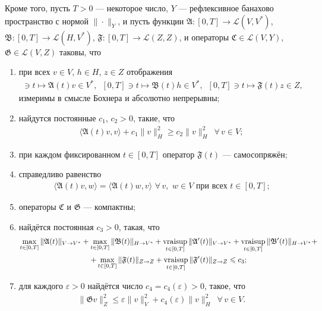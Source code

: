 \documentclass{report}
\newcommand{\vraisup}{\mathop{\rm vraisup}}
\begin{document}
Кроме того, пусть $T>0$ --- некоторое число, $Y$ --- рефлексивное банахово пространство с нормой $\|\cdot\|_Y$, и пусть функции $\mathfrak{A}:[0,T]\to \mathcal{L}(V,V^*)$, $\mathfrak{B}:[0,T]\to \mathcal{L}(H,V^*)$, $\mathfrak{F}:[0,T]\to \mathcal{L}(Z,Z)$, и операторы $\mathfrak{C}\in\mathcal{L}(V, Y)$, $\mathfrak{G}\in\mathcal{L}(V,Z)$ таковы, что
\begin{enumerate}
    \item при всех $v\in V$, $h\in H$, $z\in Z$ отображения
\begin{gather*}
[0,T]\ni t\mapsto\mathfrak{A}(t)v\in V^*,\,\,\,[0,T]\ni t\mapsto\mathfrak{B}(t)h\in V^*,\,\,\,[0,T]\ni t\mapsto\mathfrak{F}(t)z\in Z,
\end{gather*}
измеримы в смысле Бохнера и абсолютно непрерывны;

	\item найдутся постоянные $c_1$, $c_2>0$, такие, что
\begin{gather*}
\langle \mathfrak{A}(t)v,v\rangle+c_1\|v\|^2_H\geqslant c_2\|v\|^2_H\,\,\,\forall\,v\in V;
\end{gather*}

	\item при каждом фиксированном $t\in[0,T]$ оператор $\mathfrak{F}(t)$ --- самосопряжён;
	\item справедливо равенство
\begin{gather*}
\langle \mathfrak{A}(t)v,w\rangle=\langle \mathfrak{A}(t)w,v\rangle\,\,\forall\,v,\,\,w\in V\,\,\text{при всех $t\in[0,T]$;}
\end{gather*}

    \item операторы $\mathfrak{C}$ и $\mathfrak{G}$ --- компактны;
	\item найдётся постоянная $c_3>0$, такая, что
\begin{gather*}
\max\limits_{t\in[0,T]}\|\mathfrak{A}(t)\|_{V\to V^*}+\max\limits_{t\in[0,T]}\|\mathfrak{B}(t)\|_{H\to V^*}+
\vraisup\limits_{t\in[0,T]}\|\mathfrak{A}'(t)\|_{V\to V^*}+\vraisup\limits_{t\in[0,T]}\|\mathfrak{B}'(t)\|_{H\to V^*}+\\
+\max\limits_{t\in[0,T]}\|\mathfrak{F}(t)\|_{Z\to Z}+\vraisup\limits_{t\in[0,T]}\|\mathfrak{F}'(t)\|_{Z\to Z}\leqslant c_3;
\end{gather*}
	\item для каждого $\varepsilon>0$ найдётся число $c_4=c_4(\varepsilon)>0$, такое, что
\begin{gather*}
\|\mathfrak{G}v\|^2_Z\leqslant\varepsilon\|v\|^2_V+c_4(\varepsilon)\|v\|^2_H\,\,\,\forall\,v\in V.
\end{gather*}
\end{enumerate}
\end{document}
